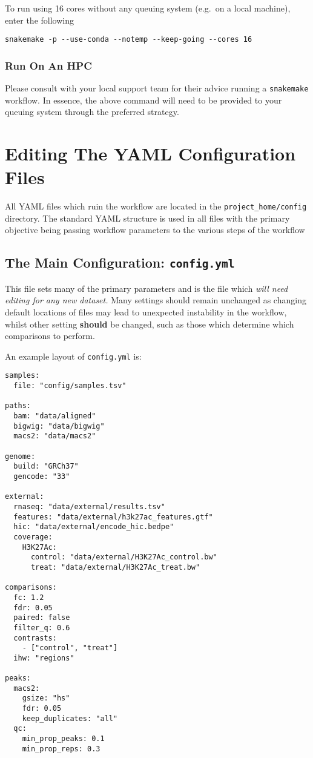 \documentclass[
]{book}
\begin{document}
To run using 16 cores without any queuing system (e.g.~on a local machine), enter the following

\begin{verbatim}
snakemake -p --use-conda --notemp --keep-going --cores 16
\end{verbatim}

\hypertarget{run-on-an-hpc}{%
\subsection{Run On An HPC}\label{run-on-an-hpc}}

Please consult with your local support team for their advice running a \texttt{snakemake} workflow.
In essence, the above command will need to be provided to your queuing system through the preferred strategy.

\hypertarget{editing-yaml}{%
\chapter{Editing The YAML Configuration Files}\label{editing-yaml}}

All YAML files which ruin the workflow are located in the \texttt{project\_home/config} directory.
The standard YAML structure is used in all files with the primary objective being passing workflow parameters to the various steps of the workflow

\hypertarget{config-yml}{%
\section{\texorpdfstring{The Main Configuration: \texttt{config.yml}}{The Main Configuration: config.yml}}\label{config-yml}}

This file sets many of the primary parameters and is the file which \emph{will need editing for any new dataset.}
Many settings should remain unchanged as changing default locations of files may lead to unexpected instability in the workflow, whilst other setting \textbf{should} be changed, such as those which determine which comparisons to perform.

An example layout of \texttt{config.yml} is:

\begin{verbatim}
samples:
  file: "config/samples.tsv"

paths:
  bam: "data/aligned"
  bigwig: "data/bigwig"
  macs2: "data/macs2"

genome:
  build: "GRCh37"
  gencode: "33"

external:
  rnaseq: "data/external/results.tsv"
  features: "data/external/h3k27ac_features.gtf"
  hic: "data/external/encode_hic.bedpe"
  coverage:
    H3K27Ac:
      control: "data/external/H3K27Ac_control.bw"
      treat: "data/external/H3K27Ac_treat.bw"

comparisons:
  fc: 1.2
  fdr: 0.05
  paired: false
  filter_q: 0.6
  contrasts:
    - ["control", "treat"]
  ihw: "regions"

peaks:
  macs2:
    gsize: "hs"
    fdr: 0.05
    keep_duplicates: "all"
  qc:
    min_prop_peaks: 0.1
    min_prop_reps: 0.3
\end{verbatim}
\end{document}
